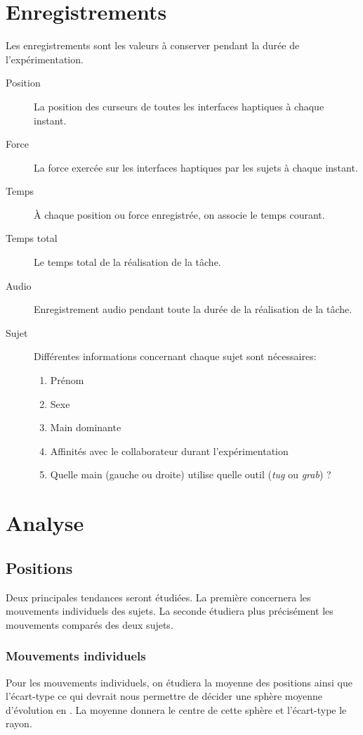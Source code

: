 \documentclass[a4paper,fleqn]{report}
\begin{document}
		\section{Enregistrements}
			Les enregistrements sont les valeurs à conserver pendant la durée de l'expérimentation.
			\begin{description}
				\item[Position] La position des curseurs de toutes les interfaces haptiques à chaque instant.
				\item[Force] La force exercée sur les interfaces haptiques par les sujets à chaque instant.
				\item[Temps] À chaque position ou force enregistrée, on associe le temps courant.
				\item[Temps total] Le temps total de la réalisation de la tâche.
				\item[Audio] Enregistrement audio pendant toute la durée de la réalisation de la tâche.
				\item[Sujet] Différentes informations concernant chaque sujet sont nécessaires:
				\begin{enumerate}
					\item Prénom 
					\item Sexe
					\item Main dominante
					\item Affinités avec le collaborateur durant l'expérimentation
					\item Quelle main (gauche ou droite) utilise quelle outil (\emph{tug} ou \emph{grab}) ?
				\end{enumerate}
			\end{description}

		\section{Analyse}
			\subsection{Positions}
				Deux principales tendances seront étudiées.
				La première concernera les mouvements individuels des sujets.
				La seconde étudiera plus précisément les mouvements comparés des deux sujets.
				\subsubsection{Mouvements individuels}
					Pour les mouvements individuels, on étudiera la moyenne des positions ainsi que l'écart-type ce qui devrait nous permettre de décider une sphère moyenne d'évolution en .
					La moyenne donnera le centre de cette sphère et l'écart-type le rayon.
\end{document}
